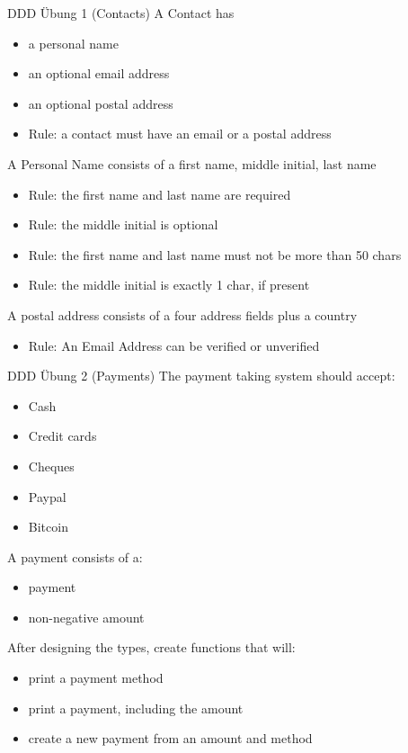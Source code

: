 \documentclass[t]{beamer}
\begin{document}
\begin{frame}[label={sec:orgff3cde3}]{DDD Übung 1 (Contacts)}
A Contact has

\begin{itemize}
\item a personal name
\item an optional email address
\item an optional postal address
\item Rule: a contact must have an email or a postal address
\end{itemize}

A Personal Name consists of a first name, middle initial, last name

\begin{itemize}
\item Rule: the first name and last name are required
\item Rule: the middle initial is optional
\item Rule: the first name and last name must not be more than 50 chars
\item Rule: the middle initial is exactly 1 char, if present
\end{itemize}

A postal address consists of a four address fields plus a country

\begin{itemize}
\item Rule: An Email Address can be verified or unverified
\end{itemize}
\end{frame}

\begin{frame}[label={sec:org827f687}]{DDD Übung 2 (Payments)}
The payment taking system should accept:

\begin{itemize}
\item Cash
\item Credit cards
\item Cheques
\item Paypal
\item Bitcoin
\end{itemize}

A payment consists of a:

\begin{itemize}
\item payment
\item non-negative amount
\end{itemize}

After designing the types, create functions that will:

\begin{itemize}
\item print a payment method
\item print a payment, including the amount
\item create a new payment from an amount and method
\end{itemize}
\end{frame}
\end{document}
